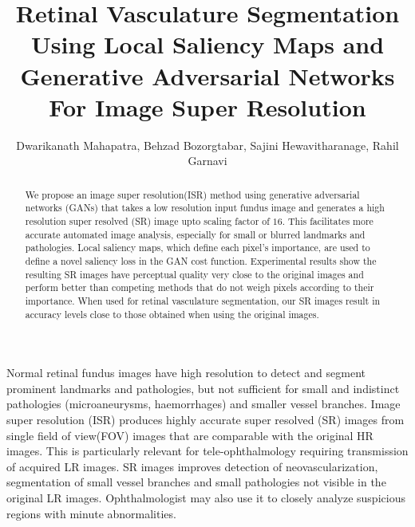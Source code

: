 \documentclass{llncs}
\begin{document}
\mainmatter


\title{Retinal Vasculature Segmentation Using Local Saliency Maps and Generative Adversarial Networks For Image Super Resolution}



\author{Dwarikanath Mahapatra, Behzad Bozorgtabar, Sajini Hewavitharanage, Rahil Garnavi
}

 




\maketitle


\begin{abstract}
We propose an image super resolution(ISR) method using generative adversarial networks (GANs) that takes a low resolution input fundus image and generates a high resolution super resolved (SR) image upto scaling factor of $16$. This facilitates more accurate automated image analysis, especially for small or blurred landmarks and pathologies. Local saliency maps, which define each pixel's importance, are used to define a novel saliency loss in the GAN cost function. Experimental results show the resulting SR images have perceptual quality very close to the original images and perform better than competing methods that do not weigh pixels according to their importance. When used for retinal vasculature segmentation, our SR images result in accuracy levels close to those obtained when using the original images.
\end{abstract}

 




Normal retinal fundus images have high resolution to detect and segment prominent landmarks and pathologies, but not sufficient for small and indistinct pathologies (microaneurysms, haemorrhages) and smaller vessel branches. Image super resolution (ISR) produces highly accurate super resolved (SR) images from single field of view(FOV) images that are comparable with the original HR images.  This is particularly relevant for tele-ophthalmology requiring transmission of acquired LR images. SR images improves detection of neovascularization, segmentation of small vessel branches and small pathologies not visible in the original LR images. Ophthalmologist may also use it to closely analyze suspicious regions with minute abnormalities.
\end{document}
